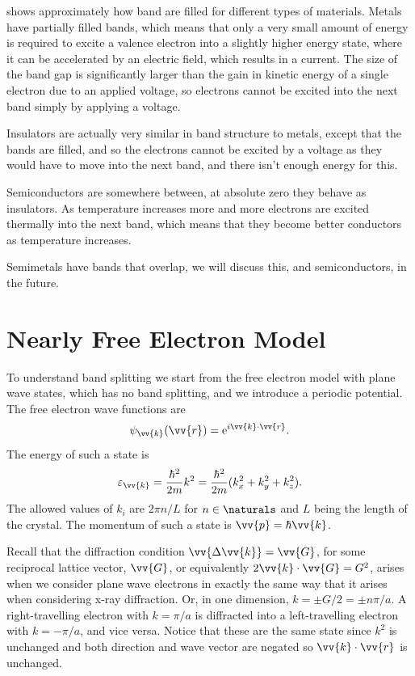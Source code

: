 \documentclass[fleqn]{NotesClass}
\newcommand*{\e}{\mathrm{e}}
\begin{document}
     shows approximately how band are filled for different types of materials.
    Metals have partially filled bands, which means that only a very small amount of energy is required to excite a valence electron into a slightly higher energy state, where it can be accelerated by an electric field, which results in a current.
    The size of the band gap is significantly larger than the gain in kinetic energy of a single electron due to an applied voltage, so electrons cannot be excited into the next band simply by applying a voltage.
    
    Insulators are actually very similar in band structure to metals, except that the bands are filled, and so the electrons cannot be excited by a voltage as they would have to move into the next band, and there isn't enough energy for this.
    
    Semiconductors are somewhere between, at absolute zero they behave as insulators.
    As temperature increases more and more electrons are excited thermally into the next band, which means that they become better conductors as temperature increases.
    
    Semimetals have bands that overlap, we will discuss this, and semiconductors, in the future.
    
    \section{Nearly Free Electron Model}
    To understand band splitting we start from the free electron model with plane wave states, which has no band splitting, and we introduce a periodic potential.
    The free electron wave functions are 
    \begin{equation}
        \psi_{\vv{k}}(\vv{r}) = \e^{i\vv{k}\cdot\vv{r}}.
    \end{equation}
    The energy of such a state is
    \begin{equation}
        \varepsilon_{\vv{k}} = \frac{\hbar^2}{2m}k^2 = \frac{\hbar^2}{2m}(k_x^2 + k_y^2 + k_z^2).
    \end{equation}
    The allowed values of \(k_i\) are \(2\pi n/L\) for \(n \in \naturals\) and \(L\) being the length of the crystal.
    The momentum of such a state is \(\vv{p} = \hbar\vv{k}\).
    
    Recall that the diffraction condition \(\vv{\Delta\vv{k}} = \vv{G}\), for some reciprocal lattice vector, \(\vv{G}\), or equivalently \(2\vv{k} \cdot \vv{G} = G^2\), arises when we consider plane wave electrons in exactly the same way that it arises when considering x-ray diffraction.
    Or, in one dimension, \(k = \pm G/2 = \pm n\pi/a\).
    A right-travelling electron with \(k = \pi/a\) is diffracted into a left-travelling electron with \(k = -\pi/a\), and vice versa.
    Notice that these are the same state since \(k^2\) is unchanged and both direction and wave vector are negated so \(\vv{k}\cdot\vv{r}\) is unchanged.
    
\end{document}
